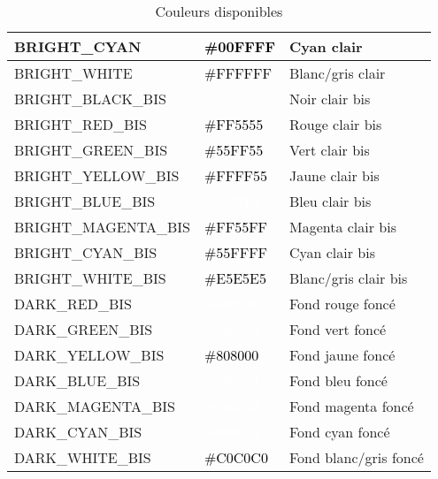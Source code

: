 \documentclass{article}
\begin{document}
\begin{table}[h!]
\begin{tabular}{|>{\centering\arraybackslash}m{4cm}|>{\centering\arraybackslash}m{3cm}|>{\centering\arraybackslash}m{3cm}|}
        \hline
        BRIGHT\_CYAN & \cellcolor[HTML]{00FFFF}\textcolor{black}{\#00FFFF} & Cyan clair \\
        \hline
        BRIGHT\_WHITE & \cellcolor[HTML]{FFFFFF}\textcolor{black}{\#FFFFFF} & Blanc/gris clair \\
        \hline
        BRIGHT\_BLACK\_BIS & \cellcolor[HTML]{555555}\textcolor{white}{\#555555} & Noir clair bis \\
        \hline
        BRIGHT\_RED\_BIS & \cellcolor[HTML]{FF5555}\textcolor{black}{\#FF5555} & Rouge clair bis \\
        \hline
        BRIGHT\_GREEN\_BIS & \cellcolor[HTML]{55FF55}\textcolor{black}{\#55FF55} & Vert clair bis \\
        \hline
        BRIGHT\_YELLOW\_BIS & \cellcolor[HTML]{FFFF55}\textcolor{black}{\#FFFF55} & Jaune clair bis \\
        \hline
        BRIGHT\_BLUE\_BIS & \cellcolor[HTML]{5555FF}\textcolor{white}{\#5555FF} & Bleu clair bis \\
        \hline
        BRIGHT\_MAGENTA\_BIS & \cellcolor[HTML]{FF55FF}\textcolor{black}{\#FF55FF} & Magenta clair bis \\
        \hline
        BRIGHT\_CYAN\_BIS & \cellcolor[HTML]{55FFFF}\textcolor{black}{\#55FFFF} & Cyan clair bis \\
        \hline
        BRIGHT\_WHITE\_BIS & \cellcolor[HTML]{E5E5E5}\textcolor{black}{\#E5E5E5} & Blanc/gris clair bis \\
        \hline
        DARK\_RED\_BIS & \cellcolor[HTML]{800000}\textcolor{white}{\#800000} & Fond rouge foncé \\
        \hline
        DARK\_GREEN\_BIS & \cellcolor[HTML]{008000}\textcolor{white}{\#008000} & Fond vert foncé \\
        \hline
        DARK\_YELLOW\_BIS & \cellcolor[HTML]{808000}\textcolor{black}{\#808000} & Fond jaune foncé \\
        \hline
        DARK\_BLUE\_BIS & \cellcolor[HTML]{000080}\textcolor{white}{\#000080} & Fond bleu foncé \\
        \hline
        DARK\_MAGENTA\_BIS & \cellcolor[HTML]{800080}\textcolor{white}{\#800080} & Fond magenta foncé \\
        \hline
        DARK\_CYAN\_BIS & \cellcolor[HTML]{008080}\textcolor{white}{\#008080} & Fond cyan foncé \\
        \hline
        DARK\_WHITE\_BIS & \cellcolor[HTML]{C0C0C0}\textcolor{black}{\#C0C0C0} & Fond blanc/gris foncé \\
        \hline
    \end{tabular}
    \caption{Couleurs disponibles}
    \label{tab:couleur}
\end{table}
\end{document}
